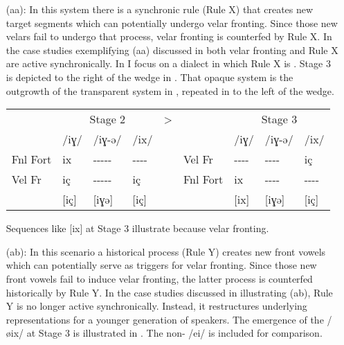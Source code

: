 \begin{itemize}
\item[(aa):] In this system there is a synchronic rule (Rule X) that creates new target segments which can potentially undergo velar fronting. Since those new velars fail to undergo that process, velar fronting is counterfed by Rule X. In the case studies exemplifying (aa) discussed in  both velar fronting and Rule X are active synchronically. In  I focus on a dialect in which Rule X is . Stage 3 is depicted to the right of the wedge in . That opaque system is the outgrowth of the transparent system in , repeated in  to the left of the wedge.

\ea \label{ex:16:6}\begin{tabular}[t]{@{}llllcllll@{}}
             &  \multicolumn{3}{c}{Stage 2}          & >  &          &     \multicolumn{3}{c}{Stage 3}           \\
             & /iɣ/ & /iɣ-ə/          &  /ix/        &    &          & /iɣ/         & /iɣ-ə/       & /ix/        \\
    Fnl Fort & ix   & {}-{}-{}-{}-{}- & {}-{}-{}-{}- &    & Vel Fr   & {}-{}-{}-{}- & {}-{}-{}-{}- & iç          \\
    Vel Fr   & iç   & {}-{}-{}-{}-{}- & iç           &    & Fnl Fort & ix           & {}-{}-{}-{}- & {}-{}-{}-{}-\\
             & [iç] & [iɣə]           & [iç]         &    &          & [ix]         & [iɣə]        & [iç]        \\
    \end{tabular}
\z 

Sequences like [ix] at Stage 3 illustrate   because   velar fronting.

\item[(ab):] In this scenario a historical process (Rule Y) creates new front vowels which can potentially serve as triggers for velar fronting. Since those new front vowels fail to induce velar fronting, the latter process is counterfed historically by Rule Y. In the case studies discussed in  illustrating (ab), Rule Y is no longer active synchronically. Instead, it restructures underlying representations for a younger generation of speakers. The emergence of the  /øix/ at Stage 3 is illustrated in . The non- /ei/ is included for comparison.


\end{itemize}
